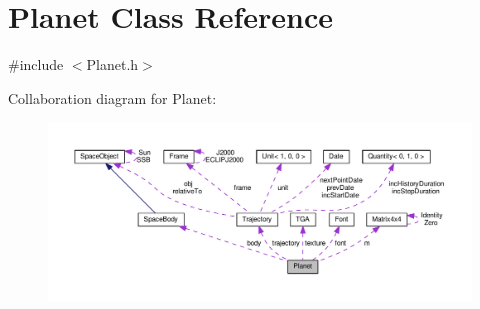 \hypertarget{class_planet}{\section{Planet Class Reference}
\label{class_planet}
}


{\ttfamily \#include $<$Planet.\+h$>$}



Collaboration diagram for Planet\+:\nopagebreak
\begin{figure}[H]
\begin{center}
\leavevmode
\includegraphics[width=350pt]{class_planet__coll__graph}
\end{center}
\end{figure}

